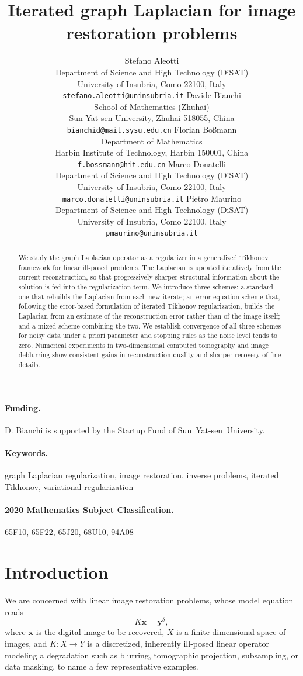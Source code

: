\documentclass{article}
\title{Iterated graph Laplacian for image restoration problems}
\author{
Stefano Aleotti\\
Department of Science and High Technology (DiSAT)\\
University of Insubria, Como 22100, Italy\\
\texttt{stefano.aleotti@uninsubria.it}
\And
Davide Bianchi\\
School of Mathematics (Zhuhai)\\
Sun Yat-sen University, Zhuhai 518055, China\\
\texttt{bianchid@mail.sysu.edu.cn}
\And
Florian Bo\ss mann\\
Department of Mathematics\\
Harbin Institute of Technology, Harbin 150001, China\\
\texttt{f.bossmann@hit.edu.cn}
\And
Marco Donatelli\\
Department of Science and High Technology (DiSAT)\\
University of Insubria, Como 22100, Italy\\
\texttt{marco.donatelli@uninsubria.it}
\And
Pietro Maurino\\
Department of Science and High Technology (DiSAT)\\
University of Insubria, Como 22100, Italy\\
\texttt{pmaurino@uninsubria.it}
}
\date{}
\theoremstyle{remark}
\newcommand{\bx}{{\bm{x}}}
\newcommand{\by}{{\bm{y}}}
\begin{document}
\maketitle

\begin{abstract}
We study the graph Laplacian operator as a regularizer in a generalized Tikhonov framework for linear ill-posed problems. The Laplacian is updated iteratively from the current reconstruction, so that progressively sharper structural information about the solution is fed into the regularization term. We introduce three schemes: a standard one that rebuilds the Laplacian from each new iterate; an error-equation scheme that, following the error-based formulation of iterated Tikhonov regularization, builds the Laplacian from an estimate of the reconstruction error rather than of the image itself; and a mixed scheme combining the two. We establish convergence of all three schemes for noisy data under a priori parameter and stopping rules as the noise level tends to zero. Numerical experiments in two-dimensional computed tomography and image deblurring show consistent gains in reconstruction quality and sharper recovery of fine details.
\end{abstract}

\paragraph{Funding.}
D. Bianchi is supported by the Startup Fund of Sun~Yat-sen~University.

\paragraph{Keywords.}
graph Laplacian regularization, image restoration, inverse problems, iterated Tikhonov, variational regularization

\paragraph{2020 Mathematics Subject Classification.}
65F10, 65F22, 65J20, 68U10, 94A08


\section{Introduction}
We are concerned with linear image restoration problems, whose model equation reads
\begin{equation*}\label{eq:Model_Equation}\tag{ME}
	K\bx = \by^\delta, 
\end{equation*}
where $\bx$ is the digital image to be recovered, $X$ is a finite dimensional space of images, and
$K \colon X \to Y$ is a discretized, inherently ill-posed linear operator modeling
a degradation such as blurring, tomographic projection, subsampling, or data masking, to name a few representative examples.
\end{document}
